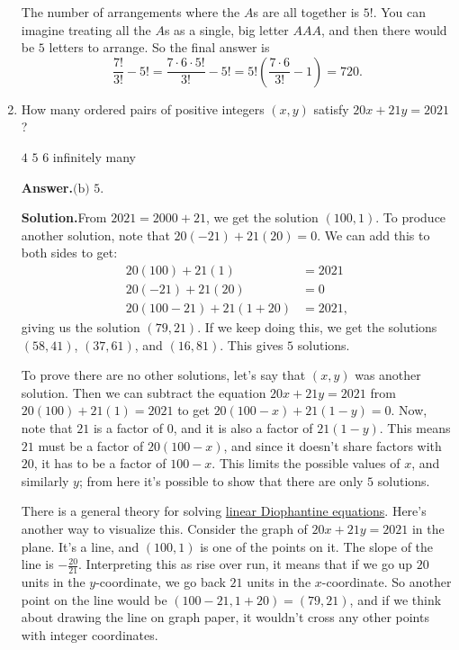 \documentclass[11pt,paper=letter]{scrartcl}
\newcommand{\ansb}[2]{{\sffamily \bfseries Answer.}\;\(\boxed{\text{(#1) #2}}\).}
\newcommand{\sol}{{\sffamily \bfseries Solution.}\;}
\newenvironment{rem}%
{\noindent \ignorespaces \small \sffamily \sansmath {\bfseries Remark.}}%
{\ignorespacesafterend}
\begin{document}
\begin{enumerate}[align=left,leftmargin=*]
The number of arrangements where the $A$s are all together is $5!$. You can imagine treating all the $A$s as a single, big letter $AAA$, and then there would be $5$ letters to arrange. So the final answer is \[
  \frac{7!}{3!} - 5! = \frac{7 \cdot 6 \cdot 5!}{3!} - 5! = 5!\left(\frac{7 \cdot 6}{3!} - 1\right) = 720.
\]

\item How many ordered pairs of positive integers $(x, y)$ satisfy $20x + 21y = 2021$?

\fourch
{$4$}
{$5$}
{$6$}
{infinitely many}

\ansb{b}{$5$}

\sol From $2021 = 2000 + 21$, we get the solution $(100, 1)$. To produce another solution, note that $20(-21) + 21(20) = 0$. We can add this to both sides to get:
\begin{align*}
20(100) + 21(1) &= 2021 \\
20(-21) + 21(20) &= 0 \\
20(100 - 21) + 21(1 + 20) &= 2021,
\end{align*}
giving us the solution $(79, 21)$. If we keep doing this, we get the solutions $(58, 41)$, $(37, 61)$, and $(16, 81)$. This gives $5$ solutions.

To prove there are no other solutions, let's say that $(x, y)$ was another solution. Then we can subtract the equation $20x + 21y = 2021$ from $20(100) + 21(1) = 2021$ to get $20(100 - x) + 21(1 - y) = 0$. Now, note that $21$ is a factor of $0$, and it is also a factor of $21(1 - y)$. This means $21$ must be a factor of $20(100 - x)$, and since it doesn't share factors with $20$, it has to be a factor of $100 - x$. This limits the possible values of $x$, and similarly $y$; from here it's possible to show that there are only $5$ solutions.

\begin{rem}
There is a general theory for solving \href{https://en.wikipedia.org/wiki/Diophantine_equation#One_equation}{linear Diophantine equations}. Here's another way to visualize this. Consider the graph of $20x + 21y = 2021$ in the plane. It's a line, and $(100, 1)$ is one of the points on it. The slope of the line is $-\frac{20}{21}$. Interpreting this as rise over run, it means that if we go up $20$ units in the $y$-coordinate, we go back $21$ units in the $x$-coordinate. So another point on the line would be $(100 - 21, 1 + 20) = (79, 21)$, and if we think about drawing the line on graph paper, it wouldn't cross any other points with integer coordinates.
\end{rem}


\end{enumerate}
\end{document}
